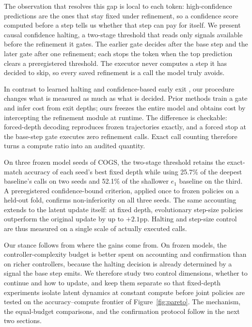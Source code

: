 \documentclass[11pt]{article}
\begin{document}
The observation that resolves this gap is local to each token: high-confidence predictions are the ones that stay fixed under refinement, so a confidence score computed before a step tells us whether that step can pay for itself. We present causal confidence halting, a two-stage threshold that reads only signals available before the refinement it gates. The earlier gate decides after the base step and the later gate after one refinement; each stops the token when the top prediction clears a preregistered threshold. The executor never computes a step it has decided to skip, so every saved refinement is a call the model truly avoids.

In contrast to learned halting \citep{graves2016adaptive,banino2021ponder} and confidence-based early exit \citep{schuster2022calm}, our procedure changes what is measured as much as what is decided. Prior methods train a gate and infer cost from exit depths; ours freezes the entire model and obtains cost by intercepting the refinement module at runtime. The difference is checkable: forced-depth decoding reproduces frozen trajectories exactly, and a forced stop at the base-step gate executes zero refinement calls. Exact call counting therefore turns a compute ratio into an audited quantity.

On three frozen model seeds of COGS, the two-stage threshold retains the exact-match accuracy of each seed's best fixed depth while using 25.7\% of the deepest baseline's calls on two seeds and 52.1\% of the shallower $e_1$ baseline on the third. A preregistered confidence-bound criterion, applied once to frozen policies on a held-out fold, confirms non-inferiority on all three seeds. The same accounting extends to the latent update itself: at fixed depth, evolutionary step-size policies outperform the original update by up to $+2.1$pp. Halting and step-size control are thus measured on a single scale of actually executed calls.

Our stance follows from where the gains come from. On frozen models, the controller-complexity budget is better spent on accounting and confirmation than on richer controllers, because the halting decision is already determined by a signal the base step emits. We therefore study two control dimensions, whether to continue and how to update, and keep them separate so that fixed-depth experiments isolate latent dynamics at constant compute before joint policies are tested on the accuracy--compute frontier of Figure~\ref{fig:pareto}. The mechanism, the equal-budget comparisons, and the confirmation protocol follow in the next two sections.
\end{document}
